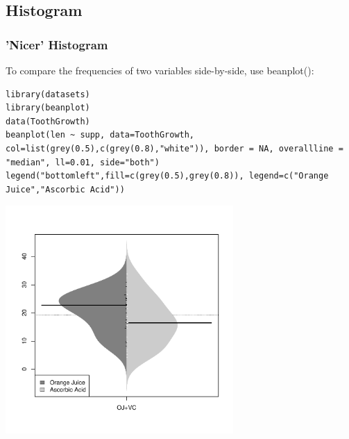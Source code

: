 \subsection{Histogram}
\begin{frame}
\frametitle{'Nicer' Histogram}

To compare the frequencies of two variables side-by-side, use \ttfamily beanplot(): \normalfont

	\begin{lstlisting}
library(datasets)
library(beanplot)
data(ToothGrowth)
beanplot(len ~ supp, data=ToothGrowth, col=list(grey(0.5),c(grey(0.8),"white")), border = NA, overallline = "median", ll=0.01, side="both")
legend("bottomleft",fill=c(grey(0.5),grey(0.8)), legend=c("Orange Juice","Ascorbic Acid"))
	\end{lstlisting}
	
        \begin{center}
	         \includegraphics[width=0.65\textwidth]{images/beanplot.pdf}
        \end{center}
\end{frame}

%


